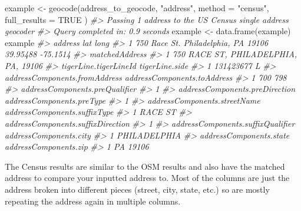 \documentclass[
]{krantz}
\makeatletter
\newenvironment{Shaded}{\begin{snugshade}}{\end{snugshade}}
\newcommand{\AttributeTok}[1]{\textcolor[rgb]{0.61,0.61,0.61}{#1}}
\newcommand{\CommentTok}[1]{\textcolor[rgb]{0.37,0.37,0.37}{\textit{#1}}}
\newcommand{\ConstantTok}[1]{\textcolor[rgb]{0,0,0}{#1}}
\newcommand{\FunctionTok}[1]{\textcolor[rgb]{0,0,0}{#1}}
\newcommand{\NormalTok}[1]{#1}
\newcommand{\OtherTok}[1]{\textcolor[rgb]{0.37,0.37,0.37}{#1}}
\newcommand{\StringTok}[1]{\textcolor[rgb]{0.5,0.5,0.5}{#1}}
\newenvironment{kframe}{%
\medskip{}
\setlength{\fboxsep}{.8em}
 \def\at@end@of@kframe{}%
 \ifinner\ifhmode%
  \def\at@end@of@kframe{\end{minipage}}%
  \begin{minipage}{\columnwidth}%
 \fi\fi%
 \def\FrameCommand##1{\hskip\@totalleftmargin \hskip-\fboxsep
 \colorbox{shadecolor}{##1}\hskip-\fboxsep
     \hskip-\linewidth \hskip-\@totalleftmargin \hskip\columnwidth}%
 \MakeFramed {\advance\hsize-\width
   \@totalleftmargin\z@ \linewidth\hsize
   \@setminipage}}%
 {\par\unskip\endMakeFramed%
 \at@end@of@kframe}
\renewenvironment{Shaded}{\begin{kframe}}{\end{kframe}}
\makeatother
\begin{document}
\begin{Shaded}
\begin{Highlighting}[]
\NormalTok{example }\OtherTok{\textless{}{-}} \FunctionTok{geocode}\NormalTok{(address\_to\_geocode, }\StringTok{"address"}\NormalTok{,}
  \AttributeTok{method =} \StringTok{"census"}\NormalTok{, }\AttributeTok{full\_results =} \ConstantTok{TRUE}
\NormalTok{)}
\CommentTok{\#\textgreater{} Passing 1 address to the US Census single address geocoder}
\CommentTok{\#\textgreater{} Query completed in: 0.9 seconds}
\NormalTok{example }\OtherTok{\textless{}{-}} \FunctionTok{data.frame}\NormalTok{(example)}
\NormalTok{example}
\CommentTok{\#\textgreater{}                               address      lat     long}
\CommentTok{\#\textgreater{} 1 750 Race St. Philadelphia, PA 19106 39.95488 {-}75.1514}
\CommentTok{\#\textgreater{}                         matchedAddress}
\CommentTok{\#\textgreater{} 1 750 RACE ST, PHILADELPHIA, PA, 19106}
\CommentTok{\#\textgreater{}   tigerLine.tigerLineId tigerLine.side}
\CommentTok{\#\textgreater{} 1             131423677              L}
\CommentTok{\#\textgreater{}   addressComponents.fromAddress addressComponents.toAddress}
\CommentTok{\#\textgreater{} 1                           700                         798}
\CommentTok{\#\textgreater{}   addressComponents.preQualifier}
\CommentTok{\#\textgreater{} 1                               }
\CommentTok{\#\textgreater{}   addressComponents.preDirection addressComponents.preType}
\CommentTok{\#\textgreater{} 1                                                         }
\CommentTok{\#\textgreater{}   addressComponents.streetName addressComponents.suffixType}
\CommentTok{\#\textgreater{} 1                         RACE                           ST}
\CommentTok{\#\textgreater{}   addressComponents.suffixDirection}
\CommentTok{\#\textgreater{} 1                                  }
\CommentTok{\#\textgreater{}   addressComponents.suffixQualifier addressComponents.city}
\CommentTok{\#\textgreater{} 1                                             PHILADELPHIA}
\CommentTok{\#\textgreater{}   addressComponents.state addressComponents.zip}
\CommentTok{\#\textgreater{} 1                      PA                 19106}
\end{Highlighting}
\end{Shaded}

The Census results are similar to the OSM results and also
have the matched address to compare your inputted address
to. Most of the columns are just the address broken into
different pieces (street, city, state, etc.) so are mostly
repeating the address again in multiple columns.
\end{document}
